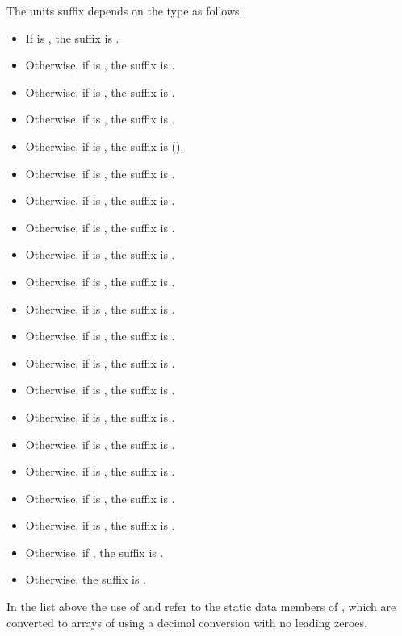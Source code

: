 \begin{itemdescr}
\pnum
The units suffix depends on the type  as follows:
\begin{itemize}
\item If  is , the suffix is .
\item Otherwise, if  is , the suffix is .
\item Otherwise, if  is , the suffix is .
\item Otherwise, if  is , the suffix is .
\item Otherwise, if  is , the suffix is  ().
\item Otherwise, if  is , the suffix is .
\item Otherwise, if  is , the suffix is .
\item Otherwise, if  is , the suffix is .
\item Otherwise, if  is , the suffix is .
\item Otherwise, if  is , the suffix is .
\item Otherwise, if  is , the suffix is .
\item Otherwise, if  is , the suffix is .
\item Otherwise, if  is , the suffix is .
\item Otherwise, if  is , the suffix is .
\item Otherwise, if  is , the suffix is .
\item Otherwise, if  is , the suffix is .
\item Otherwise, if  is , the suffix is .
\item Otherwise, if  is , the suffix is .
\item Otherwise, if  is , the suffix is .
\item Otherwise, if , the suffix is .
\item Otherwise, the suffix is .
\end{itemize}
In the list above the use of  and 
refer to the static data members of ,
which are converted to arrays of  using a decimal conversion with no leading zeroes.


\end{itemdescr}
